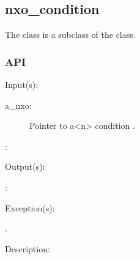 %
%
%
%
%              

\subsection{nxo\_condition}
\label{nxo_condition}

The  class is a subclass of the  class.

\subsubsection{API}
\begin{capi}
\label{nxo_condition_}
	\begin{capilist}
	\item[Input(s): ]
		\begin{description}\item[]
		\item[a\_nxo: ]
			Pointer to a<n> condition .
		\item[: ]
		\end{description}
	\item[Output(s): ]
		\begin{description}\item[]
		\item[: ]
		\end{description}
	\item[Exception(s): ]
		\begin{description}\item[]
		\item[.]
		\end{description}
	\item[Description: ]
	\end{capilist}
\end{capi}
